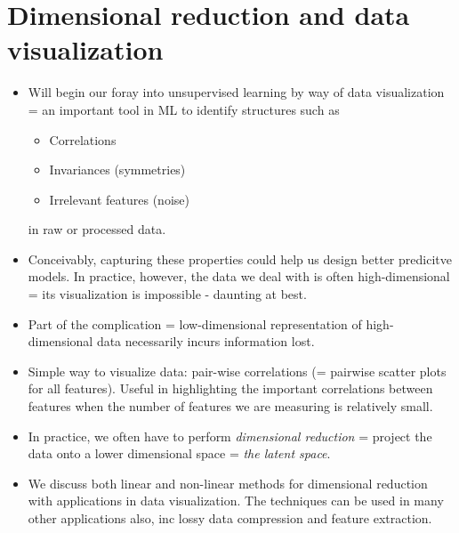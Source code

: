 \documentclass[norsk,a4paper,11pt]{article}
\begin{document}
\section{Dimensional reduction and data visualization}
\begin{itemize}
	\item Will begin our foray into unsupervised learning by way of data visualization = an important tool in ML to identify structures such as
	\begin{itemize}
		\item Correlations
		\item Invariances (symmetries)
		\item Irrelevant features (noise)
	\end{itemize}
	in raw or processed data.
	\item Conceivably, capturing these properties could help us design better predicitve models. In practice, however, the data we deal with is often high-dimensional = its visualization is impossible - daunting at best.
	\item Part of the complication = low-dimensional representation of high-dimensional data necessarily incurs information lost.
	\item Simple way to visualize data: pair-wise correlations (= pairwise scatter plots for all features). Useful in highlighting the important correlations between features when the number of features we are measuring is relatively small. 
	\item In practice, we often have to perform \textit{dimensional reduction} = project the data onto a lower dimensional space = \textit{the latent space}.
	\item We discuss both linear and non-linear methods for dimensional reduction with applications in data visualization. The techniques can be used in many other applications also, inc lossy data compression and feature extraction.
\end{itemize}
\end{document}
